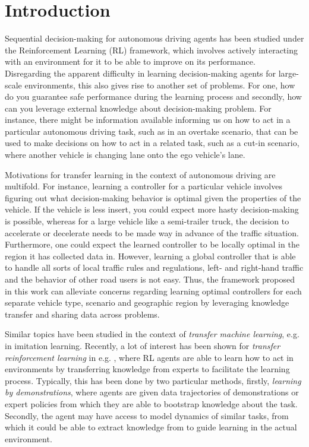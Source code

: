 \section{Introduction}\label{sec:intro}

Sequential decision-making for autonomous driving agents has been studied under the Reinforcement Learning (RL) framework, which involves actively interacting with an environment for it to be able to improve on its performance. Disregarding the apparent difficulty in learning decision-making agents for large-scale environments, this also gives rise to another set of problems. For one, how do you guarantee safe performance during the learning process and secondly, how can you leverage external knowledge about decision-making problem. For instance, there might be information available informing us on how to act in a particular autonomous driving task, such as in an overtake scenario, that can be used to make decisions on how to act in a related task, such as a cut-in scenario, where another vehicle is changing lane onto the ego vehicle's lane.


Motivations for transfer learning in the context of autonomous driving are multifold. For instance, learning a controller for a particular vehicle involves figuring out what decision-making behavior is optimal given the properties of the vehicle. If the vehicle is less insert, you could expect more hasty decision-making is possible, whereas for a large vehicle like a semi-trailer truck, the decision to accelerate or decelerate needs to be made way in advance of the traffic situation. Furthermore, one could expect the learned controller to be locally optimal in the region it has collected data in. However, learning a global controller that is able to handle all sorts of local traffic rules and regulations, left- and right-hand traffic and the behavior of other road users is not easy. Thus, the framework proposed in this work can alleviate concerns regarding learning optimal controllers for each separate vehicle type, scenario and geographic region by leveraging knowledge transfer and sharing data across problems.

Similar topics have been studied in the context of \emph{transfer machine learning}, e.g. in imitation learning. Recently, a lot of interest has been shown for \emph{transfer reinforcement learning} in e.g. \cite{zhu2020transfer}, where RL agents are able to learn how to act in environments by transferring knowledge from experts to facilitate the learning process. Typically, this has been done by two particular methods, firstly, \emph{learning by demonstrations}, where agents are given data trajectories of demonstrations or expert policies from which they are able to bootstrap knowledge about the task. Secondly, the agent may have access to model dynamics of similar tasks, from which it could be able to extract knowledge from to guide learning in the actual environment.

